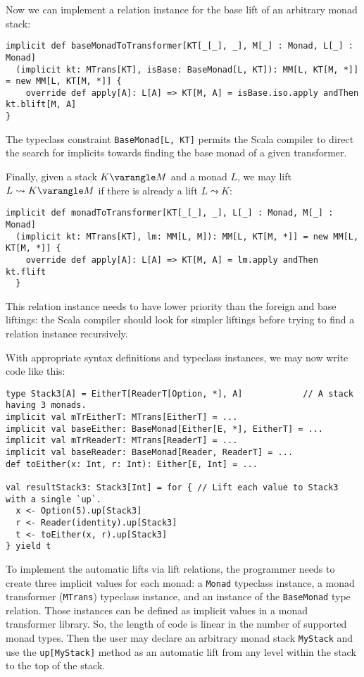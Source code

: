 Now we can implement a relation instance for the base lift of an arbitrary
monad stack:
\begin{lstlisting}
implicit def baseMonadToTransformer[KT[_[_], _], M[_] : Monad, L[_] : Monad]
  (implicit kt: MTrans[KT], isBase: BaseMonad[L, KT]): MM[L, KT[M, *]] = new MM[L, KT[M, *]] {
    override def apply[A]: L[A] => KT[M, A] = isBase.iso.apply andThen kt.blift[M, A]
}
\end{lstlisting}
The typeclass constraint \lstinline!BaseMonad[L, KT]! permits the
Scala compiler to direct the search for implicits towards finding
the base monad of a given transformer.

Finally, given a stack $K\varangle M$ and a monad $L$, we may lift
$L\leadsto K\varangle M$ if there is already a lift $L\leadsto K$:
\begin{lstlisting}
implicit def monadToTransformer[KT[_[_], _], L[_] : Monad, M[_] : Monad]
  (implicit kt: MTrans[KT], lm: MM[L, M]): MM[L, KT[M, *]] = new MM[L, KT[M, *]] {
    override def apply[A]: L[A] => KT[M, A] = lm.apply andThen kt.flift
  }
\end{lstlisting}
This relation instance needs to have lower priority than the foreign
and base liftings: the Scala compiler should look for simpler liftings
before trying to find a relation instance recursively.

With appropriate syntax definitions and typeclass instances, we may
now write code like this:
\begin{lstlisting}
type Stack3[A] = EitherT[ReaderT[Option, *], A]            // A stack having 3 monads.
implicit val mTrEitherT: MTrans[EitherT] = ...
implicit val baseEither: BaseMonad[Either[E, *], EitherT] = ...
implicit val mTrReaderT: MTrans[ReaderT] = ...
implicit val baseReader: BaseMonad[Reader, ReaderT] = ...
def toEither(x: Int, r: Int): Either[E, Int] = ...

val resultStack3: Stack3[Int] = for { // Lift each value to Stack3 with a single `up`. 
  x <- Option(5).up[Stack3]
  r <- Reader(identity).up[Stack3]
  t <- toEither(x, r).up[Stack3]
} yield t
\end{lstlisting}

To implement the automatic lifts via lift relations, the programmer
needs to create three implicit values for each monad: a \lstinline!Monad!
typeclass instance, a monad transformer (\lstinline!MTrans!) typeclass
instance, and an instance of the \lstinline!BaseMonad! type relation.
Those instances can be defined as implicit values in a monad transformer
library. So, the length of code is linear in the number of supported
monad types. Then the user may declare an arbitrary monad stack \lstinline!MyStack!
and use the \lstinline!up[MyStack]! method as an automatic lift from
any level within the stack to the top of the stack.

